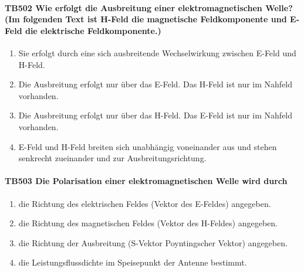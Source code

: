 \documentclass[8pt]{article}
\begin{document}
\begin{enumerate}
\paragraph*{TB502 Wie erfolgt die Ausbreitung einer elektromagnetischen Welle? (Im folgenden Text ist H-Feld die magnetische Feldkomponente und E-Feld die elektrische Feldkomponente.)}
\begin{enumerate}[nolistsep,label=\Alph*]
\item Sie erfolgt durch eine sich ausbreitende Wechselwirkung zwischen E-Feld und H-Feld.
\item Die Ausbreitung erfolgt nur über das E-Feld. Das H-Feld ist nur im Nahfeld vorhanden.
\item Die Ausbreitung erfolgt nur über das H-Feld. Das E-Feld ist nur im Nahfeld vorhanden.
\item E-Feld und H-Feld breiten sich unabhängig voneinander aus und stehen senkrecht zueinander und zur Ausbreitungsrichtung.
\end{enumerate}



\paragraph*{TB503 Die Polarisation einer elektromagnetischen Welle wird durch} 
\begin{enumerate}[nolistsep,label=\Alph*]
\item die Richtung des elektrischen Feldes (Vektor des E-Feldes) angegeben.
\item die Richtung des magnetischen Feldes (Vektor des H-Feldes) angegeben.
\item die Richtung der Ausbreitung (S-Vektor Poyntingscher Vektor) angegeben.
\item die Leistungsflussdichte im Speisepunkt der Antenne bestimmt.
\end{enumerate}




\end{enumerate}
\end{document}
